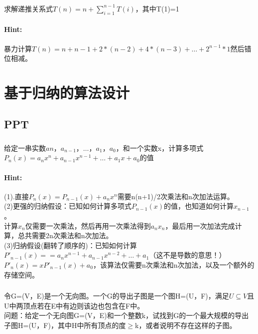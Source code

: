 \documentclass{article}
\begin{document}
     \subsubsection{}求解递推关系式$T(n) = n + \sum ^{n-1}_{i=1}T(i)$，其中T(1)=1
     \paragraph{Hint:}暴力计算$T(n) = n + n-1 + 2*(n-2)+4*(n-3)+\dots + 2^{n-1}*1$然后错位相减。
     
     \section{基于归纳的算法设计}
     \subsection{PPT}
     
     \subsubsection{}给定一串实数$an，a_{n-1}，…，a_1，a_0$，和一个实数x，计算多项式$P_{n}(x)=a_{n}x^{n}+a_{n-1}x^{n-1}+…+a_{1}x+a_{0}$的值
     \paragraph{Hint:}(1).直接$P_{n}(x)= P_{n-1}(x)+a_{n}x^{n}$需要n(n+1)/2次乘法和n次加法运算。\\
    (2)更强的归纳假设：已知如何计算多项式$P_{n-1}(x)$的值，也知道如何计算$x_{n-1}$。\\
    计算$x_{n}$仅需要一次乘法，然后再用一次乘法得到$a_{n}x_{n}$，最后用一次加法完成计算，总共需要2n次乘法和n次加法。\\
    (3)归纳假设(翻转了顺序的)：已知如何计算$P'_{n-1}(x) = =a_{n}x^{n-1}+a_{n-1}x^{n-2}+…+a_{1}$（这不是导数的意思！）\\
    $P'_{n}(x) = xP'_{n-1}(x)+a_{0}$，该算法仅需要n次乘法和n次加法，以及一个额外的存储空间。\\
    
     \subsubsection{}令G=(V，E)是一个无向图。一个G的导出子图是一个图H=(U，F)，满足$U \subseteq V$且U中两顶点若在E中有边则该边也包含在F中。\\
     问题：给定一个无向图G=(V，E)和一个整数k，试找到G的一个最大规模的导出子图H=(U，F)，其中H中所有顶点的度$\geq$k，或者说明不存在这样的子图。\\
\end{document}

